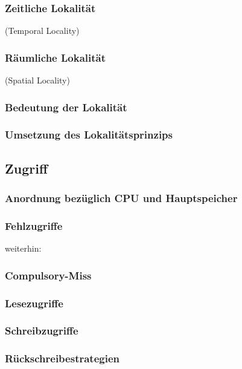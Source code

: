 \subsubsection{Zeitliche Lokalität}
(Temporal Locality)

\subsubsection{Räumliche Lokalität}
(Spatial Locality)

\subsubsection{Bedeutung der Lokalität}

\subsubsection{Umsetzung des Lokalitätsprinzips}

\subsection{Zugriff}
\subsubsection{Anordnung bezüglich CPU und Hauptspeicher}
\subsubsection{Fehlzugriffe}
weiterhin:
\subsubsection*{Compulsory-Miss}

\subsubsection{Lesezugriffe}

\subsubsection{Schreibzugriffe}
\subsubsection*{Rückschreibestrategien}
